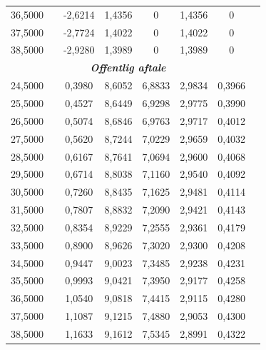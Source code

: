 \documentclass{article}
\begin{document}
\begin{table}[h]
\begin{center}
\begin{tabular}{cXcccccr}
36{,}5000&&-2{,}6214& 1{,}4356&0& 1{,}4356&0\\
37{,}5000&&-2{,}7724& 1{,}4022&0& 1{,}4022&0\\
38{,}5000&&-2{,}9280& 1{,}3989&0& 1{,}3989&0\\
\multicolumn{7}{c}{\emph{\textbf{Offentlig aftale}}} \\
 24{,}5000&&0{,}3980&8{,}6052&6{,}8833&2{,}9834&0{,}3966 \\
 25{,}5000&&0{,}4527&8{,}6449&6{,}9298&2{,}9775&0{,}3990\\
 26{,}5000&&0{,}5074&8{,}6846&6{,}9763&2{,}9717&0{,}4012\\
 27{,}5000&&0{,}5620&8{,}7244&7{,}0229&2{,}9659&0{,}4032\\
 28{,}5000&&0{,}6167&8{,}7641&7{,}0694&2{,}9600&0{,}4068\\
 29{,}5000&&0{,}6714&8{,}8038&7{,}1160&2{,}9540&0{,}4092\\
 30{,}5000&&0{,}7260&8{,}8435&7{,}1625&2{,}9481&0{,}4114\\
 31{,}5000&&0{,}7807&8{,}8832&7{,}2090&2{,}9421&0{,}4143\\
 32{,}5000&&0{,}8354&8{,}9229&7{,}2555&2{,}9361&0{,}4179\\
 33{,}5000&&0{,}8900&8{,}9626&7{,}3020&2{,}9300&0{,}4208\\
 34{,}5000&&0{,}9447&9{,}0023&7{,}3485&2{,}9238&0{,}4231\\
 35{,}5000&&0{,}9993&9{,}0421&7{,}3950&2{,}9177&0{,}4258\\
 36{,}5000&&1{,}0540&9{,}0818&7{,}4415&2{,}9115&0{,}4280\\
 37{,}5000&&1{,}1087&9{,}1215&7{,}4880&2{,}9053&0{,}4300\\
 38{,}5000&&1{,}1633&9{,}1612&7{,}5345&2{,}8991&0{,}4322\\

\bottomrule[1pt]
	\end{tabular}
\end{center}
\end{table}
\end{document}
